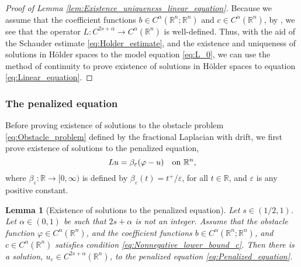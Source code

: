 \documentclass[11pt,reqno]{amsart}
\newtheorem{lem}[thm]{Lemma}
\theoremstyle{definition}
\theoremstyle{remark}
\begin{document}
\begin{proof}[Proof of Lemma \ref{lem:Existence_uniqueness_linear_equation}]
Because we assume that the coefficient functions $b\in C^{\alpha}({\mathbb{R}}^n;{\mathbb{R}}^n)$ and $c\in C^{\alpha}({\mathbb{R}}^n)$, by \cite[Proposition 2.5]{Silvestre_2007}, we see that the operator $L:C^{2s+\alpha} \rightarrow C^{\alpha}({\mathbb{R}}^n)$ is well-defined. Thus, with the aid of the Schauder estimate \eqref{eq:Holder_estimate}, and the existence and uniqueness of solutions in H\"older spaces to the model equation \eqref{eq:L_0}, we can use the method of continuity to prove existence of solutions in H\"older spaces to equation \eqref{eq:Linear_equation}.
\end{proof}

\subsubsection{The penalized equation}
\label{subsec:Penalized_equation}
Before proving existence of solutions to the obstacle problem \eqref{eq:Obstacle_problem} defined by the fractional Laplacian with drift, we first prove existence of solutions to the penalized equation,
\begin{equation}
\label{eq:Penalized_equation}
L u = \beta_{\varepsilon}(\varphi-u)\quad\hbox{on }{\mathbb{R}}^n,
\end{equation}
where $\beta_{\varepsilon}:{\mathbb{R}}\rightarrow [0,\infty)$ is defined by $\beta_{\varepsilon}(t) = t^+/{\varepsilon}$, for all $t\in{\mathbb{R}}$, and ${\varepsilon}$ is any positive constant.

\begin{lem}[Existence of solutions to the penalized equation]
\label{lem:Existence_penalized_equation}
Let $s\in(1/2,1)$. Let $\alpha \in (0,1)$ be such that $2s+\alpha$ is not an integer. Assume that the obstacle function $\varphi\in C^{\alpha}({\mathbb{R}}^n)$, and the coefficient functions $b \in C^{\alpha}({\mathbb{R}}^n;{\mathbb{R}}^n)$, and $c \in C^{\alpha}({\mathbb{R}}^n)$ satisfies condition \eqref{eq:Nonnegative_lower_bound_c}. Then there is a solution, $u_{\varepsilon}\in C^{2s+\alpha}({\mathbb{R}}^n)$, to the penalized equation \eqref{eq:Penalized_equation}. 
\end{lem}
\end{document}
